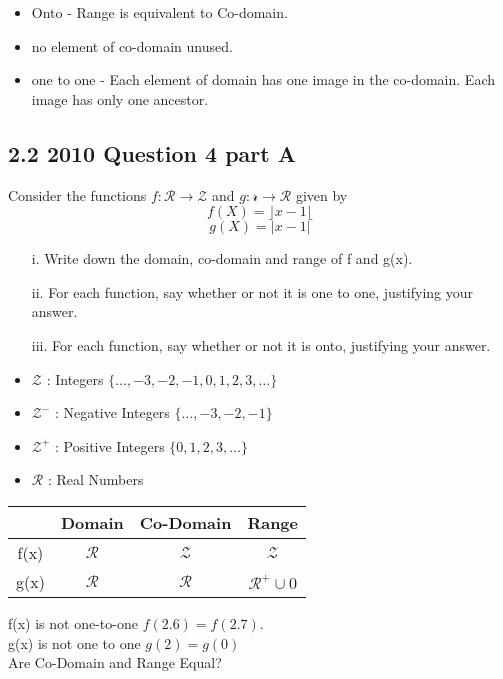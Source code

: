\documentclass[12 pt]{article}
\begin{document}
\begin{itemize}
\item Onto - Range is equivalent to Co-domain.
\item no element of co-domain unused.
\item one to one - Each element of domain has one image in the co-domain. Each image has only one ancestor.
\end{itemize}

\subsection*{2.2 2010 Question 4 part A}


Consider the functions $f: \mathcal{R} \rightarrow \mathcal{Z}$ and $g: \mathcal{r} \rightarrow \mathcal{R}$ given by
\[f(X) = \rfloor x-1 \lfloor \]
\[g(X) = | x-1 | \]

\begin{itemize}
\item[i.] Write down the domain, co-domain and range of f and g(x). 
\item[ii.] For each function, say whether or not it is one to one, justifying your
answer. 
\item[iii.] For each function, say whether or not it is onto, justifying your answer.
\end{itemize}


\begin{itemize}
\item $\mathcal{Z}$ : Integers $ \{\ldots,-3,-2,-1,0,1,2,3, \ldots\}$
\item $\mathcal{Z}^{-}$ : Negative Integers $\{\ldots,-3,-2,-1\}$
\item $\mathcal{Z}^{+}$ : Positive Integers $\{0,1,2,3, \ldots\}$
\item $\mathcal{R}$ : Real Numbers
\end{itemize}

\begin{tabular}{|c|c|c|c|}
\hline  & Domain & Co-Domain  & Range  \\ 
\hline f(x) & $\mathcal{R}$ & $\mathcal{Z}$ & $\mathcal{Z}$ \\ 
\hline  g(x)& $\mathcal{R}$ & $\mathcal{R}$ & $\mathcal{R}^{+} \cup {0} $\\ 
\hline 
\end{tabular} 
f(x) is not one-to-one $f(2.6) = f(2.7)$.\\
g(x) is not one to one $g(2) =g(0)$\\
Are Co-Domain and Range Equal?\\
\end{document}
